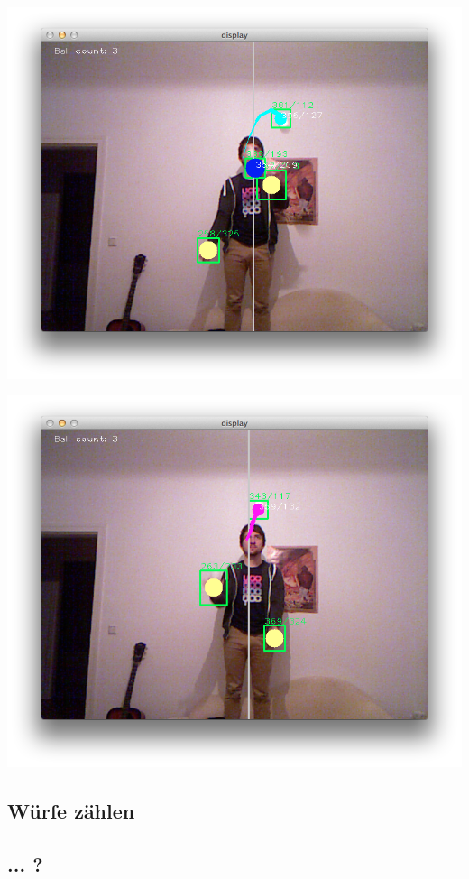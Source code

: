 \documentclass[12pt,a4paper,ngerman]{scrartcl}
\begin{document}
\includegraphics[scale=0.5]{img/ballcount-1.png}

\includegraphics[scale=0.5]{img/ballcount-2.png}


\subsection{Würfe zählen}

\subsection{... ?}
\end{document}
